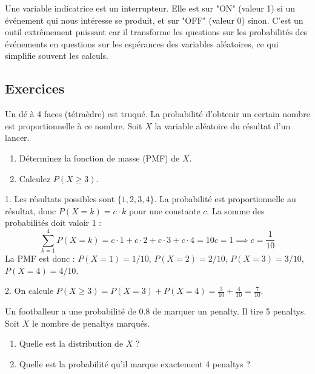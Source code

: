 \begin{intuitionbox}
Une variable indicatrice est un interrupteur. Elle est sur "ON" (valeur 1) si un événement qui nous intéresse se produit, et sur "OFF" (valeur 0) sinon. C'est un outil extrêmement puissant car il transforme les questions sur les probabilités des événements en questions sur les espérances des variables aléatoires, ce qui simplifie souvent les calculs.
\end{intuitionbox}

\subsection{Exercices}

\begin{exercicebox}
Un dé à 4 faces (tétraèdre) est truqué. La probabilité d'obtenir un certain nombre est proportionnelle à ce nombre. Soit $X$ la variable aléatoire du résultat d'un lancer.
\begin{enumerate}
    \item Déterminez la fonction de masse (PMF) de $X$.
    \item Calculez $P(X \ge 3)$.
\end{enumerate}
\end{exercicebox}

\begin{correctionbox}
1. Les résultats possibles sont $\{1, 2, 3, 4\}$. La probabilité est proportionnelle au résultat, donc $P(X=k) = c \cdot k$ pour une constante $c$.
La somme des probabilités doit valoir 1 :
$$ \sum_{k=1}^{4} P(X=k) = c \cdot 1 + c \cdot 2 + c \cdot 3 + c \cdot 4 = 10c = 1 \implies c = \frac{1}{10} $$
La PMF est donc : $P(X=1)=1/10$, $P(X=2)=2/10$, $P(X=3)=3/10$, $P(X=4)=4/10$.

2. On calcule $P(X \ge 3) = P(X=3) + P(X=4) = \frac{3}{10} + \frac{4}{10} = \frac{7}{10}$.
\end{correctionbox}

\begin{exercicebox}
Un footballeur a une probabilité de $0.8$ de marquer un penalty. Il tire 5 penaltys. Soit $X$ le nombre de penaltys marqués.
\begin{enumerate}
    \item Quelle est la distribution de $X$ ?
    \item Quelle est la probabilité qu'il marque exactement 4 penaltys ?
\end{enumerate}
\end{exercicebox}

